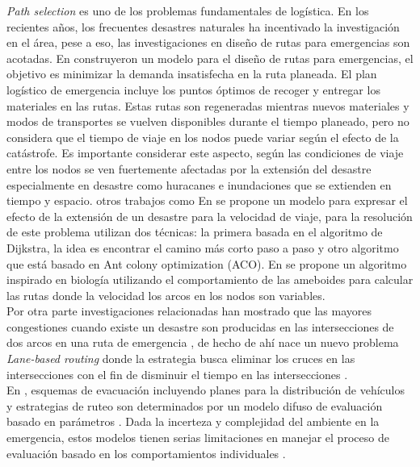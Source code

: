 \documentclass[letter, 10pt]{article}
\begin{document}
\textit{Path selection} es uno de los problemas fundamentales de logística. En los recientes años, los frecuentes desastres naturales ha incentivado la investigación en el área, pese a eso, las investigaciones en diseño de rutas para emergencias son acotadas. 
En \cite{ozdamar2004emergency} construyeron un modelo para el diseño de rutas para emergencias, el objetivo es minimizar la demanda insatisfecha en la ruta planeada. El plan logístico de emergencia incluye los puntos óptimos de recoger y entregar los materiales en las rutas. Estas rutas son regeneradas mientras nuevos materiales y modos de transportes se vuelven disponibles durante el tiempo planeado, pero no considera que el tiempo de viaje en los nodos puede variar según el efecto de la catástrofe.
Es  importante considerar este aspecto, según \cite{farahmand1997application,tufekci1995integrated} las condiciones de viaje entre los nodos se ven fuertemente afectadas por la extensión del desastre especialmente en desastre como huracanes e inundaciones que se extienden en tiempo y espacio. otros trabajos como 
En \cite{Yuan20091081} se propone un modelo para expresar el efecto de la extensión de un desastre para la velocidad de viaje, para la resolución de este problema utilizan dos técnicas: la primera basada en el algoritmo de Dijkstra, la idea es encontrar el camino más corto paso a paso y otro algoritmo que está basado en Ant colony optimization (ACO). 
En \cite{zhang2013route} se propone un algoritmo inspirado en biología utilizando el comportamiento de las ameboides para calcular las rutas donde la velocidad los arcos en los nodos son variables.\\
Por otra parte investigaciones relacionadas han mostrado que las mayores congestiones cuando existe un desastre son producidas en las intersecciones de dos arcos en una ruta de emergencia \cite{southworth1991regional,cova2003network}, de hecho de ahí nace un nuevo problema \textit{Lane-based routing} donde la estrategia busca eliminar los cruces en las intersecciones con el fin de disminuir el tiempo en las intersecciones \cite{cova2003network}.\\
En \cite{tan2011if}, esquemas de evacuación incluyendo planes para la distribución de vehículos y estrategias de ruteo son determinados por un modelo difuso de evaluación basado en parámetros \cite{tan2011if}. Dada la incerteza y complejidad del ambiente en la emergencia, estos modelos tienen serias limitaciones en manejar el proceso de evaluación basado en los comportamientos individuales \cite{liu2016evacuation}.\\
\end{document}

